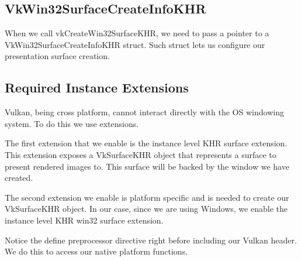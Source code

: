 \begin{minipage}{\linewidth}{\noindent}
    
\end{minipage}

\subsection{VkWin32SurfaceCreateInfoKHR}

When we call vkCreateWin32SurfaceKHR, we need to pass a pointer to a
VkWin32SurfaceCreateInfoKHR struct.
Such struct lets us configure our presentation surface creation.

\begin{minipage}{\linewidth}{\noindent}
    
\end{minipage}

\subsection{Required Instance Extensions}

Vulkan, being cross platform, cannot interact directly with the OS windowing system.
To do this we use extensions.

The first extension that we enable is the instance level KHR surface extension.
This extension exposes a VkSurfaceKHR object that represents a surface to present
rendered images to.
This surface will be backed by the window we have created.

The second extension we enable is platform specific and is needed
to create our VkSurfaceKHR object.
In our case, since we are using Windows, we enable the instance level KHR win32
surface extension.

\begin{minipage}{\linewidth}{\noindent}
    
\end{minipage}

Notice the define preprocessor directive right before including our Vulkan header.
We do this to access our native platform functions.


